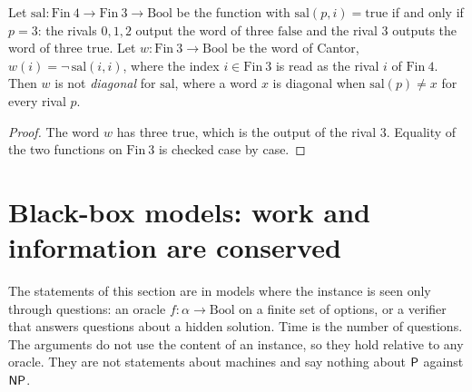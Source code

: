 \begin{theorem}
  \label{thm:barriers-cantor-no-basta}
  \leanok
  Let $\mathrm{sal} : \mathrm{Fin}\ 4 \to \mathrm{Fin}\ 3 \to \mathrm{Bool}$ be the function with
  $\mathrm{sal}(p, i) = \mathrm{true}$ if and only if $p = 3$: the rivals $0, 1, 2$ output the word
  of three $\mathrm{false}$ and the rival $3$ outputs the word of three $\mathrm{true}$. Let $w :
  \mathrm{Fin}\ 3 \to \mathrm{Bool}$ be the word of Cantor, $w(i) = \neg\,\mathrm{sal}(i, i)$, where
  the index $i \in \mathrm{Fin}\ 3$ is read as the rival $i$ of $\mathrm{Fin}\ 4$. Then $w$ is not
  \emph{diagonal} for $\mathrm{sal}$, where a word $x$ is diagonal when $\mathrm{sal}(p) \ne x$ for
  every rival $p$.
  \own{}
\end{theorem}

\begin{proof}
  \leanok
  The word $w$ has three $\mathrm{true}$, which is the output of the rival $3$. Equality of the two
  functions on $\mathrm{Fin}\ 3$ is checked case by case.
\end{proof}

\section{Black-box models: work and information are conserved}
\label{sec:barriers-blackbox}

The statements of this section are in models where the instance is seen only through questions: an
oracle $f : \alpha \to \mathrm{Bool}$ on a finite set of options, or a verifier that answers
questions about a hidden solution. Time is the number of questions. The arguments do not use the
content of an instance, so they hold relative to any oracle. They are not statements about
machines and say nothing about $\mathsf{P}$ against $\mathsf{NP}$.

